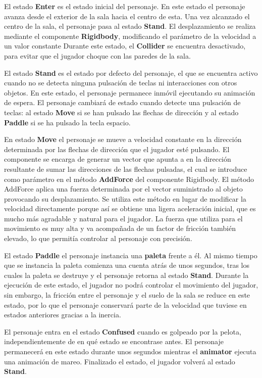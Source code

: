 El estado \textbf{Enter} es el estado inicial del personaje. En este estado el personaje avanza desde el exterior de la sala hacia el centro de esta. Una vez alcanzado el centro de la sala, el personaje pasa al estado \textbf{Stand}. El desplazamiento se realiza mediante el componente \textbf{Rigidbody}, modificando el parámetro de la velocidad a un valor constante Durante este estado, el \textbf{Collider} se encuentra desactivado, para evitar que el jugador choque con las paredes de la sala.

El estado \textbf{Stand} es el estado por defecto del personaje, el que se encuentra activo cuando no se detecta ninguna pulsación de teclas ni interacciones con otros objetos. En este estado, el personaje permanece inmóvil ejecutando su animación de espera. El personaje cambiará de estado cuando detecte una pulsación de teclas: al estado \textbf{Move} si se han pulsado las flechas de dirección y al estado \textbf{Paddle} si se ha pulsado la tecla espacio.

En estado \textbf{Move} el personaje se mueve a velocidad constante en la dirección determinada por las flechas de dirección que el jugador esté pulsando. El componente se encarga de generar un vector que apunta a en la dirección resultante de sumar las direcciones de las flechas pulsadas, el cual se introduce como parámetro en el método \textbf{AddForce} del componente Rigidbody. El método AddForce aplica una fuerza determinada por el vector suministrado al objeto provocando su desplazamiento. Se utiliza este método en lugar de modificar la velocidad directamente porque así se obtiene una ligera aceleración inicial, que es mucho más agradable y natural para el jugador. La fuerza que utiliza para el movimiento es muy alta y va acompañada de un factor de fricción también elevado, lo que permitía controlar al personaje con precisión.

El estado \textbf{Paddle} el personaje instancia una \textbf{paleta} frente a él. Al mismo tiempo que se instancia la paleta comienza una cuenta atrás de unos segundos, tras los cuales la paleta se destruye y el personaje retorna al estado \textbf{Stand}. Durante la ejecución de este estado, el jugador no podrá controlar el movimiento del jugador, sin embargo, la fricción entre el personaje y el suelo de la sala se reduce en este estado, por lo que el personaje conservará parte de la velocidad que tuviese en estados anteriores gracias a la inercia.

El personaje entra en el estado \textbf{Confused} cuando es golpeado por la pelota, independientemente de en qué estado se encontrase antes. El personaje permanecerá en este estado durante unos segundos mientras el \textbf{animator} ejecuta una animación de mareo. Finalizado el estado, el jugador volverá al estado \textbf{Stand}.

